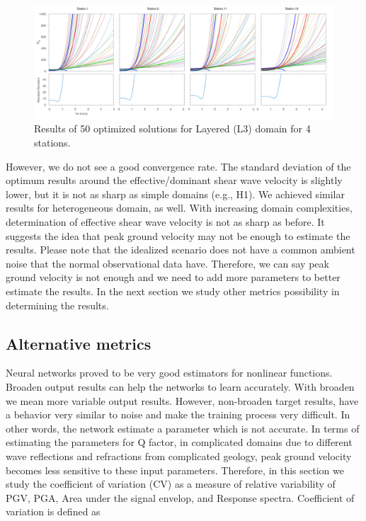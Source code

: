   \begin{figure}[ht]
    \centering
    \includegraphics[width=\textwidth]{figures/pdf/station_1_2000_1000_500_L3_nt.pdf}
    \caption{Results of 50 optimized solutions for Layered (L3) domain for 4 stations.}
    \label{fig:station_1_2000_1000_500_L3_nt}
\end{figure}

However, we do not see a good convergence rate. The standard deviation of the optimum results around the effective/dominant shear wave velocity is slightly lower, but it is not as sharp as simple domains (e.g., H1). We achieved similar results for heterogeneous domain, as well. With increasing domain complexities, determination of effective shear wave velocity is not as sharp as before. It suggests the idea that peak ground velocity may not be enough to estimate the results. Please note that the idealized scenario does not have a common ambient noise that the normal observational data have. Therefore, we can say peak ground velocity is not enough and we need to add more parameters to better estimate the results. In the next section we study other metrics possibility in determining the results. 

\subsection{Alternative metrics}

Neural networks proved to be very good estimators for nonlinear functions. Broaden output results can help the networks to learn accurately. With broaden we mean more variable output results. However, non-broaden target results, have a behavior very similar to noise and make the training process very difficult. In other words, the network estimate a parameter which is not accurate. In terms of estimating the parameters for Q factor, in complicated domains due to different wave reflections and refractions from complicated geology, peak ground velocity becomes less sensitive to these input parameters. Therefore, in this section we study the coefficient of variation (CV) as a measure of relative variability of PGV,  PGA, Area under the signal envelop, and Response spectra. Coefficient of variation is defined as 

